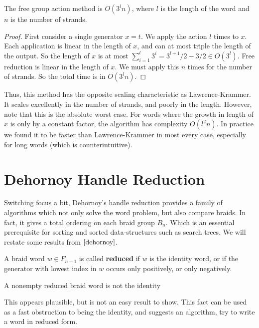 \documentclass[12pt]{thesis}
\begin{document}
\begin{proposition}
    The free group action method is $O(3^{l} n)$, where $l$ is the length of the word
    and $n$ is the number of strands.
\end{proposition}

\begin{proof}
    First consider a single generator $x = t$.
    We apply the action $l$ times to $x$.
    Each application is linear in the length of $x$,
    and can at most triple the length of the output.
    So the length of $x$ is at most $\sum_{i=1}^{l} 3^{i} = 3^{l+1}/2 - 3/2 \in O(3^{l})$.
    Free reduction is linear in the length of $x$.
    We must apply this $n$ times for the number of strands.
    So the total time is in $O(3^{l}n)$.
\end{proof}

Thus, this method has the opposite scaling characteristic as Lawrence-Krammer.
It scales excellently in the number of strands,
and poorly in the length.
However, note that this is the absolute worst case.
For words where the growth in length of $x$ is only
by a constant factor, the algorithm has complexity $O(l^{2}n)$.
In practice we found it to be faster than Lawrence-Krammer
in most every case, especially for long words (which is counterintuitive).

\section{Dehornoy Handle Reduction}

Switching focus a bit,
Dehornoy's handle reduction \cite{dehornoy}
provides a family of algorithms which not only solve the word problem, 
but also compare braids.
In fact, it gives a total ordering on each braid group $B_{n}$.
Which is an essential prerequisite for sorting
and sorted data-structures such as search trees.
We will restate some results from $\cite{dehornoy}$.

\begin{definition}
    A braid word $w \in F_{n-1}$ is called \textbf{reduced} if $w$ is the identity word,
    or if the generator with lowest index in $w$ occurs only positively,
    or only negatively.
\end{definition}

\begin{proposition}
    \label{reduced-is-not-identity}
    A nonempty reduced braid word is not the identity
\end{proposition}
This appears plausible, but is not an easy result to show. 
This fact can be used as a fast obstruction
to being the identity, and suggests an algorithm,
try to write a word in reduced form.
\end{document}
